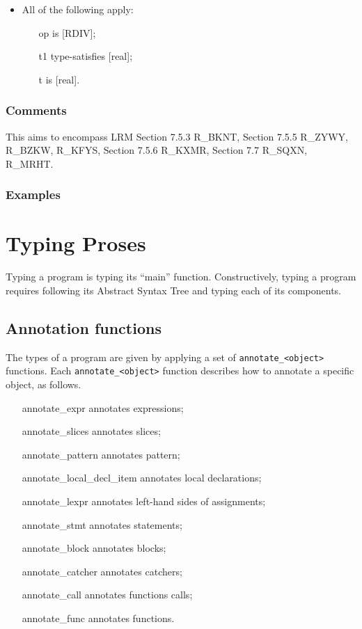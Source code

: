 \documentclass{book}
\begin{document}
\begin{itemize}
  \item  All of the following apply:
    \begin{itemize}
    \item  [op] is [RDIV];
    \item  [t1] type-satisfies [real];
    \item  [t] is [real].
    \end{itemize}
\end{itemize}

\subsection{Comments}
  This aims to encompass LRM Section 7.5.3 R\_BKNT, Section 7.5.5 R\_ZYWY, R\_BZKW,
  R\_KFYS, Section 7.5.6 R\_KXMR, Section 7.7 R\_SQXN, R\_MRHT.

\subsection{Examples} 

\chapter{
Typing Proses
}


Typing a program is typing its ``main'' function.  Constructively, typing a program
requires following its Abstract Syntax Tree and typing each of its components.

\section{Annotation functions}
The types of a program are given by applying a set of
\texttt{annotate\_<object>} functions. Each \texttt{annotate\_<object>}
function describes how to annotate a specific object, as follows.
\begin{itemize}
\item  [annotate\_expr] annotates expressions;
\item  [annotate\_slices] annotates slices;
\item  [annotate\_pattern] annotates pattern;
\item  [annotate\_local\_decl\_item] annotates local declarations;
\item  [annotate\_lexpr] annotates left-hand sides of assignments;
\item  [annotate\_stmt] annotates statements;
\item  [annotate\_block] annotates blocks;
\item  [annotate\_catcher] annotates catchers;
\item  [annotate\_call] annotates functions calls;
\item  [annotate\_func] annotates functions.
\end{itemize}
\end{document}
